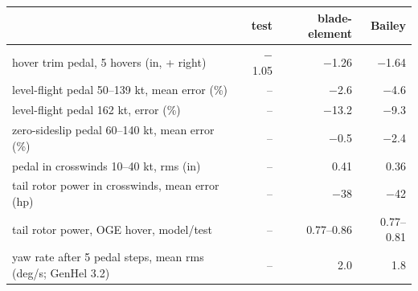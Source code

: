 \begin{tabular}{@{}>{\raggedright\arraybackslash}p{3.7cm}rrr@{}}
\toprule
 & test & blade-element & Bailey \\
\midrule
hover trim pedal, 5 hovers (in, + right) & $-$1.05 & $-$1.26 & $-$1.64 \\
level-flight pedal 50--139 kt, mean error (\%) & -- & $-$2.6 & $-$4.6 \\
level-flight pedal 162 kt, error (\%) & -- & $-$13.2 & $-$9.3 \\
zero-sideslip pedal 60--140 kt, mean error (\%) & -- & $-$0.5 & $-$2.4 \\
pedal in crosswinds 10--40 kt, rms (in) & -- & 0.41 & 0.36 \\
tail rotor power in crosswinds, mean error (hp) & -- & $-$38 & $-$42 \\
tail rotor power, OGE hover, model/test & -- & 0.77--0.86 & 0.77--0.81 \\
yaw rate after 5 pedal steps, mean rms (deg/s; GenHel 3.2) & -- & 2.0 & 1.8 \\
\bottomrule
\end{tabular}
